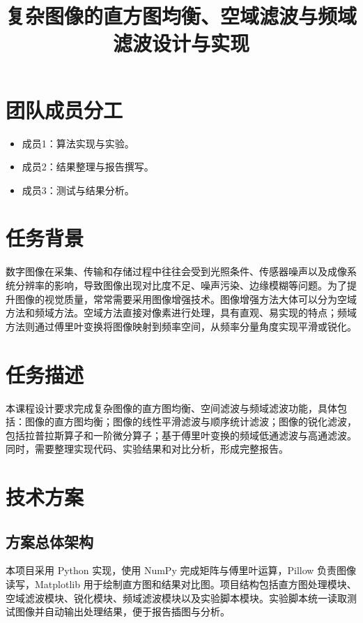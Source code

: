\documentclass{report}
\title{复杂图像的直方图均衡、空域滤波与频域滤波设计与实现}
\begin{document}
\maketitle
\pagestyle{plain}
\tableofcontents
\newpage
\pagestyle{plain}
\setcounter{page}{1}

\section{团队成员分工}
\begin{itemize}
    \item 成员1：算法实现与实验。
    \item 成员2：结果整理与报告撰写。
    \item 成员3：测试与结果分析。
\end{itemize}

\section{任务背景}
数字图像在采集、传输和存储过程中往往会受到光照条件、传感器噪声以及成像系统分辨率的影响，导致图像出现对比度不足、噪声污染、边缘模糊等问题。为了提升图像的视觉质量，常常需要采用图像增强技术。图像增强方法大体可以分为空域方法和频域方法。空域方法直接对像素进行处理，具有直观、易实现的特点；频域方法则通过傅里叶变换将图像映射到频率空间，从频率分量角度实现平滑或锐化。

\section{任务描述}
本课程设计要求完成复杂图像的直方图均衡、空间滤波与频域滤波功能，具体包括：图像的直方图均衡；图像的线性平滑滤波与顺序统计滤波；图像的锐化滤波，包括拉普拉斯算子和一阶微分算子；基于傅里叶变换的频域低通滤波与高通滤波。同时，需要整理实现代码、实验结果和对比分析，形成完整报告。

\section{技术方案}
\subsection{方案总体架构}
本项目采用 Python 实现，使用 NumPy 完成矩阵与傅里叶运算，Pillow 负责图像读写，Matplotlib 用于绘制直方图和结果对比图。项目结构包括直方图处理模块、空域滤波模块、锐化模块、频域滤波模块以及实验脚本模块。实验脚本统一读取测试图像并自动输出处理结果，便于报告插图与分析。
\end{document}
